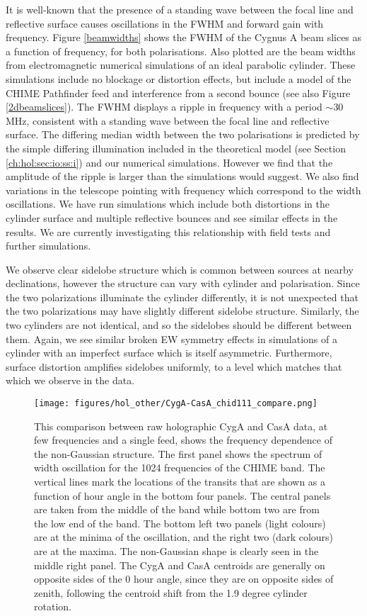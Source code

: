 It is well-known \citep{wander1, wander2} that the presence of a standing wave between the focal line and reflective surface causes oscillations in the FWHM and forward gain with frequency. Figure \ref{beamwidths} shows the FWHM of the Cygnus A beam slices as a function of frequency, for both polarisations. Also plotted are the beam widths from electromagnetic numerical simulations of an ideal parabolic cylinder. These simulations include no blockage or distortion effects, but include a model of the CHIME Pathfinder feed \citep{meiling} and interference from a second bounce (see also Figure \ref{2dbeamslices}). The FWHM displays a ripple in frequency with a period $\sim$30 MHz, consistent with a standing wave between the focal line and reflective surface. The differing median width between the two polarisations is predicted by the simple differing illumination included in the theoretical model (see Section \ref{ch:hol:sec:io:ss:i}) and our numerical simulations. However we find that the amplitude of the ripple is larger than the simulations would suggest. We also find variations in the telescope pointing with frequency which correspond to the width oscillations. We have run simulations which include both distortions in the cylinder surface and multiple reflective bounces and see similar effects in the results. We are currently investigating this relationship with field tests and further simulations.

We observe clear sidelobe structure which is common between sources at nearby declinations, however the structure can vary with cylinder and polarisation. Since the two polarizations illuminate the cylinder differently, it is not unexpected that the two polarizations may have slightly different sidelobe structure. Similarly, the two cylinders are not identical, and so the sidelobes should be different between them. Again, we see similar broken EW symmetry effects in simulations of a cylinder with an imperfect surface which is itself asymmetric. Furthermore, surface distortion amplifies sidelobes uniformly, to a level which matches that which we observe in the data.

\begin{figure}[t]
\texttt{[image: figures/hol\_other/CygA-CasA\_chid111\_compare.png]}
\caption{This comparison between raw holographic CygA and CasA data, at few frequencies and a single feed, shows the frequency dependence of the non-Gaussian structure. The first panel shows the spectrum of width oscillation for the 1024 frequencies of the CHIME band. The vertical lines mark the locations of the transits that are shown as a function of hour angle in the bottom four panels. The central panels are taken from the middle of the band while bottom two are from the low end of the band. The bottom left two panels (light colours) are at the minima of the oscillation, and the right two (dark colours) are at the maxima. The non-Gaussian shape is clearly seen in the middle right panel. The CygA and CasA centroids are generally on opposite sides of the 0 hour angle, since they are on opposite sides of zenith, following the centroid shift from the 1.9 degree cylinder rotation.}
\label{cygacasa}
\end{figure} 

